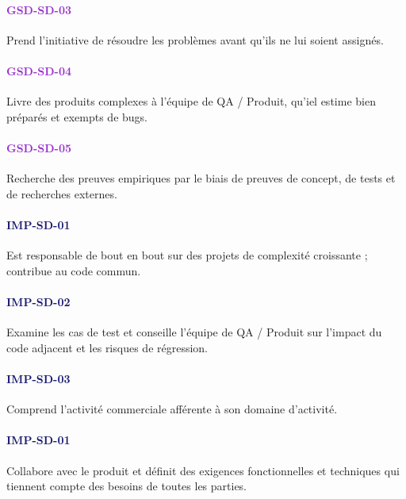 \documentclass[a4paper, french, openany, 12pt]{book}
\newcommand\str[1]{\textcolor{DarkOrchid}{\textbf{\uppercase{gsd-{#1}}}}}
\newcommand\wis[1]{\textcolor{MidnightBlue}{\textbf{\uppercase{imp-{#1}}}}}
\begin{document}
\begin{multicols}{2}
  \paragraph*{\str{sd-03}}

  Prend l'initiative de résoudre les problèmes avant qu'ils ne lui soient assignés. 

  \paragraph*{\str{sd-04}}

  Livre des produits complexes à l'équipe de QA / Produit, qu'iel estime bien préparés et exempts de bugs.

  \paragraph*{\str{sd-05}}

  Recherche des preuves empiriques par le biais de preuves de concept, de tests et de recherches externes.

  \paragraph*{\wis{sd-01}}

  Est responsable de bout en bout sur des projets de complexité croissante ; contribue au code commun.

  \paragraph*{\wis{sd-02}}

  Examine les cas de test et conseille l'équipe de QA / Produit sur l'impact du code adjacent et les risques de 
  régression.

  \paragraph*{\wis{sd-03}}

  Comprend l'activité commerciale afférente à son domaine d'activité.

  \paragraph*{\wis{sd-01}}

  Collabore avec le produit et définit des exigences fonctionnelles et techniques 
  qui tiennent compte des besoins de toutes les parties.


\end{multicols}
\end{document}
